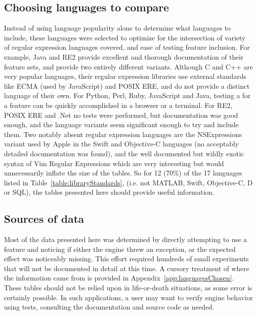\subsection*{Choosing languages to compare}
\label{app:languagesChosen}
Instead of using language popularity alone to determine what languages to include, these languages were selected to optimize for the intersection of variety of regular expression languages covered, and ease of testing feature inclusion.  For example, Java and RE2 provide excellent and thorough documentation of their feature sets, and provide two entirely different variants.  Although C and C++ are very popular languages, their regular expression libraries use external standards like ECMA (used by JavaScript) and POSIX ERE, and do not provide a distinct language of their own.  For Python, Perl, Ruby, JavaScript and Java, testing a for a feature can be quickly accomplished in a browser or a terminal.  For RE2, POSIX ERE and .Net no tests were performed, but documentation was good enough, and the language variants seem significant enough to try and include them.  Two notably absent regular expression languages are the NSExpressions variant used by Apple in the Swift and Objective-C languages (no acceptably detailed documentation was found), and the well documented but wildly exotic syntax of Vim Regular Expressions which are very interesting but would unnecessarily inflate the size of the tables. So for 12 (70\%) of the 17 languages listed in Table~\ref{table:libraryStandards}, (i.e. not MATLAB, Swift, Objective-C, D or SQL), the tables presented here should provide useful information.

\subsection*{Sources of data}
\label{app:sourcesAndTechniques}
Most of the data presented here was determined by directly attempting to use a feature and noticing if either the engine threw an exception, or the expected effect was noticeably missing.  This effort required hundreds of small experiments that will not be documented in detail at this time.  A cursory treatment of where the information came from is provided in Appendix~\ref{app:languagesChosen}.  These tables should not be relied upon in life-or-death situations, as some error is certainly possible.  In such applications, a user may want to verify engine behavior using tests, consulting the documentation and source code as needed.



